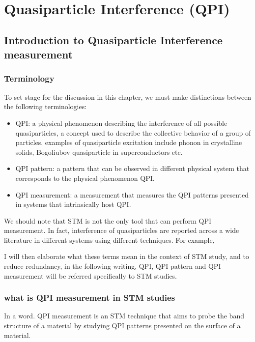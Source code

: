 \chapter{Quasiparticle Interference (QPI)}
\section{Introduction to Quasiparticle Interference measurement}

\subsection{Terminology}
To set stage for the discussion in this chapter, we must make distinctions between the following terminologies: 
\begin{itemize}
	\item \ac{QPI}: a physical phenomenon describing the interference of all possible quasiparticles, a concept used to describe the collective behavior of a group of particles. examples of quasiparticle excitation include phonon in crystalline solids, Bogoliubov quasiparticle in superconductors etc. 
	\item QPI pattern: a pattern that can be observed in different physical system that corresponds to the physical phenomenon QPI.
	\item QPI measurement: a measurement that measures the QPI patterns presented in systems that intrinsically host QPI.
\end{itemize}
We should note that STM is not the only tool that can perform QPI measurement. In fact, interference of quasiparticles are reported across a wide literature in different systems using different techniques. For example,

I will then elaborate what these terms mean in the context of STM study, and to reduce redundancy, in the following writing, QPI, QPI pattern and QPI measurement will be referred specifically to STM studies.

\subsection{what is QPI measurement in STM studies}
In a word. QPI measurement is an STM technique that aims to probe the band structure of a material by studying QPI patterns presented on the surface of a material. 

